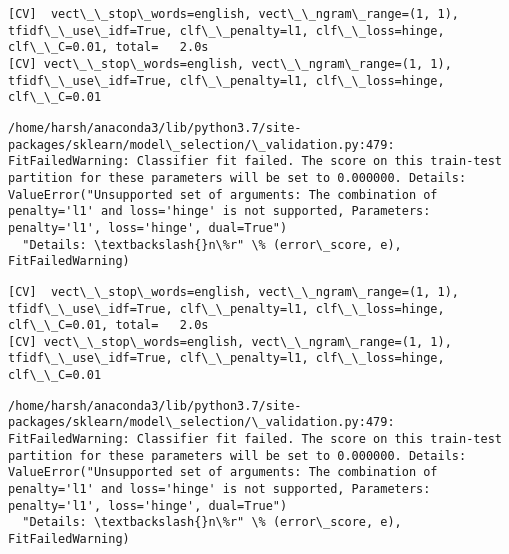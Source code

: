 \documentclass[11pt]{article}
\begin{document}
    \begin{Verbatim}[commandchars=\\\{\}]
[CV]  vect\_\_stop\_words=english, vect\_\_ngram\_range=(1, 1), tfidf\_\_use\_idf=True, clf\_\_penalty=l1, clf\_\_loss=hinge, clf\_\_C=0.01, total=   2.0s
[CV] vect\_\_stop\_words=english, vect\_\_ngram\_range=(1, 1), tfidf\_\_use\_idf=True, clf\_\_penalty=l1, clf\_\_loss=hinge, clf\_\_C=0.01 

    \end{Verbatim}

    \begin{Verbatim}[commandchars=\\\{\}]
/home/harsh/anaconda3/lib/python3.7/site-packages/sklearn/model\_selection/\_validation.py:479: FitFailedWarning: Classifier fit failed. The score on this train-test partition for these parameters will be set to 0.000000. Details: 
ValueError("Unsupported set of arguments: The combination of penalty='l1' and loss='hinge' is not supported, Parameters: penalty='l1', loss='hinge', dual=True")
  "Details: \textbackslash{}n\%r" \% (error\_score, e), FitFailedWarning)

    \end{Verbatim}

    \begin{Verbatim}[commandchars=\\\{\}]
[CV]  vect\_\_stop\_words=english, vect\_\_ngram\_range=(1, 1), tfidf\_\_use\_idf=True, clf\_\_penalty=l1, clf\_\_loss=hinge, clf\_\_C=0.01, total=   2.0s
[CV] vect\_\_stop\_words=english, vect\_\_ngram\_range=(1, 1), tfidf\_\_use\_idf=True, clf\_\_penalty=l1, clf\_\_loss=hinge, clf\_\_C=0.01 

    \end{Verbatim}

    \begin{Verbatim}[commandchars=\\\{\}]
/home/harsh/anaconda3/lib/python3.7/site-packages/sklearn/model\_selection/\_validation.py:479: FitFailedWarning: Classifier fit failed. The score on this train-test partition for these parameters will be set to 0.000000. Details: 
ValueError("Unsupported set of arguments: The combination of penalty='l1' and loss='hinge' is not supported, Parameters: penalty='l1', loss='hinge', dual=True")
  "Details: \textbackslash{}n\%r" \% (error\_score, e), FitFailedWarning)

    \end{Verbatim}
\end{document}
